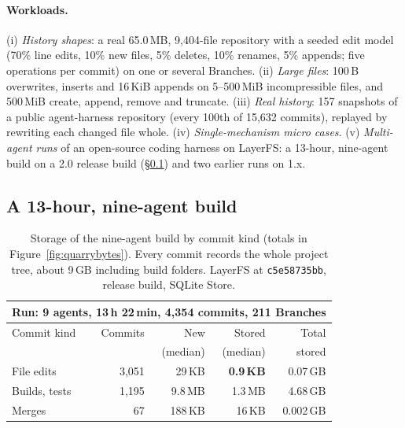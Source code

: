 \documentclass[letterpaper,twocolumn,10pt]{article}
\newcommand{\sys}{LayerFS}
\begin{document}
\paragraph{Workloads.} (i) \emph{History shapes}: a real 65.0\,MB,
9,404-file repository with a seeded edit model (70\% line edits, 10\% new
files, 5\% deletes, 10\% renames, 5\% appends; five operations per commit)
on one or several Branches. (ii) \emph{Large files}: 100\,B overwrites,
inserts and 16\,KiB appends on 5--500\,MiB incompressible files, and
500\,MiB create, append, remove and truncate. (iii) \emph{Real history}:
157 snapshots of a public agent-harness repository (every 100th of 15,632
commits), replayed by rewriting each changed file whole. (iv)
\emph{Single-mechanism micro cases}. (v) \emph{Multi-agent runs} of an
open-source coding harness on \sys{}: a 13-hour, nine-agent build on a 2.0
release build (\S\ref{sec:eval-casestudy}) and two earlier runs on 1.x.

\subsection{A 13-hour, nine-agent build}
\label{sec:eval-casestudy}

\begin{table}[t]
\centering
\small
\setlength{\tabcolsep}{3pt}
\begin{tabular}{l r r r r}
\toprule
\multicolumn{5}{l}{\textbf{Run}: 9 agents, 13\,h 22\,min, 4,354 commits, 211 Branches} \\
\midrule
Commit kind & Commits & New & Stored & Total \\
 & & (median) & (median) & stored \\
\midrule
File edits      & 3,051 & 29\,KB  & \textbf{0.9\,KB} & 0.07\,GB \\
Builds, tests   & 1,195 & 9.8\,MB & 1.3\,MB & 4.68\,GB \\
Merges          & 67    & 188\,KB & 16\,KB  & 0.002\,GB \\
\bottomrule
\end{tabular}
\caption{Storage of the nine-agent build by commit kind (totals in
Figure~\ref{fig:quarrybytes}). Every commit records the whole project tree,
about 9\,GB including build folders. \sys{} at
\texttt{c5e58735bb}, release build, SQLite Store.}
\label{tab:quarry}
\end{table}
\end{document}
